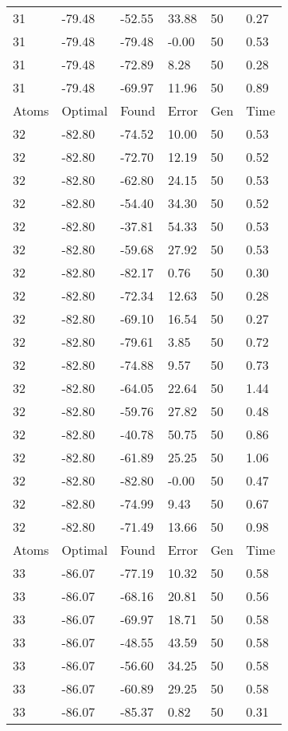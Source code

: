 \documentclass{report}
\begin{document}
\begin{appendix}
\begin{longtable}{llllll}
31 & -79.48 & -52.55 & 33.88 & 50 & 0.27 \\
31 & -79.48 & -79.48 & -0.00 & 50 & 0.53 \\
31 & -79.48 & -72.89 & 8.28 & 50 & 0.28 \\
31 & -79.48 & -69.97 & 11.96 & 50 & 0.89 \\
Atoms & Optimal & Found & Error & Gen & Time \\
32 & -82.80 & -74.52 & 10.00 & 50 & 0.53 \\
32 & -82.80 & -72.70 & 12.19 & 50 & 0.52 \\
32 & -82.80 & -62.80 & 24.15 & 50 & 0.53 \\
32 & -82.80 & -54.40 & 34.30 & 50 & 0.52 \\
32 & -82.80 & -37.81 & 54.33 & 50 & 0.53 \\
32 & -82.80 & -59.68 & 27.92 & 50 & 0.53 \\
32 & -82.80 & -82.17 & 0.76 & 50 & 0.30 \\
32 & -82.80 & -72.34 & 12.63 & 50 & 0.28 \\
32 & -82.80 & -69.10 & 16.54 & 50 & 0.27 \\
32 & -82.80 & -79.61 & 3.85 & 50 & 0.72 \\
32 & -82.80 & -74.88 & 9.57 & 50 & 0.73 \\
32 & -82.80 & -64.05 & 22.64 & 50 & 1.44 \\
32 & -82.80 & -59.76 & 27.82 & 50 & 0.48 \\
32 & -82.80 & -40.78 & 50.75 & 50 & 0.86 \\
32 & -82.80 & -61.89 & 25.25 & 50 & 1.06 \\
32 & -82.80 & -82.80 & -0.00 & 50 & 0.47 \\
32 & -82.80 & -74.99 & 9.43 & 50 & 0.67 \\
32 & -82.80 & -71.49 & 13.66 & 50 & 0.98 \\
Atoms & Optimal & Found & Error & Gen & Time \\
33 & -86.07 & -77.19 & 10.32 & 50 & 0.58 \\
33 & -86.07 & -68.16 & 20.81 & 50 & 0.56 \\
33 & -86.07 & -69.97 & 18.71 & 50 & 0.58 \\
33 & -86.07 & -48.55 & 43.59 & 50 & 0.58 \\
33 & -86.07 & -56.60 & 34.25 & 50 & 0.58 \\
33 & -86.07 & -60.89 & 29.25 & 50 & 0.58 \\
33 & -86.07 & -85.37 & 0.82 & 50 & 0.31 \\

\end{longtable}
\end{appendix}
\end{document}
